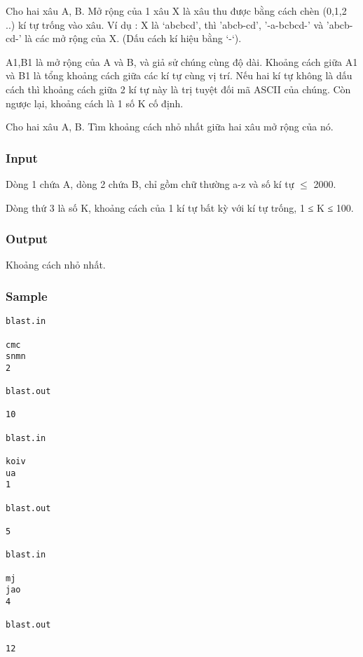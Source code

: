 



   Cho hai xâu A, B.  Mở rộng của 1 xâu X là xâu thu được bằng cách chèn (0,1,2 ..) kí tự trống vào xâu.  Ví dụ :  X là ‘abcbcd’, thì 'abcb-cd', '-a-bcbcd-'  và 'abcb-cd-'  là các mở rộng của X. (Dấu cách kí hiệu bằng ‘-‘).  

   A1,B1 là mở rộng của A và B, và giả sử chúng cùng độ dài. Khoảng cách giữa  A1 và B1 là tổng khoảng cách giữa các kí tự cùng vị trí. Nếu hai kí tự  không là dấu cách thì khoảng cách giữa 2 kí tự này là trị tuyệt đối mã  ASCII của chúng. Còn ngược lại, khoảng cách là 1 số K cố định.  

   Cho hai xâu A, B. Tìm khoảng cách nhỏ nhất giữa hai xâu mở rộng của nó.  

\subsubsection{   Input  }

   Dòng 1 chứa A, dòng 2 chứa B, chỉ gồm chữ thường a-z và số kí tự  $\le$ 2000.  

   Dòng thứ 3 là số K, khoảng cách của 1 kí tự bất kỳ với kí tự trống, 1 ≤ K ≤ 100.  

\subsubsection{   Output  }

   Khoảng cách nhỏ nhất.  

\subsubsection{   Sample  }


\begin{verbatim}
blast.in 
 
cmc 
snmn 
2 
 
blast.out 
 
10 

blast.in 
 
koiv 
ua 
1 
 
blast.out 
 
5

blast.in 
 
mj 
jao 
4 
 
blast.out 
 
12 

\end{verbatim}

